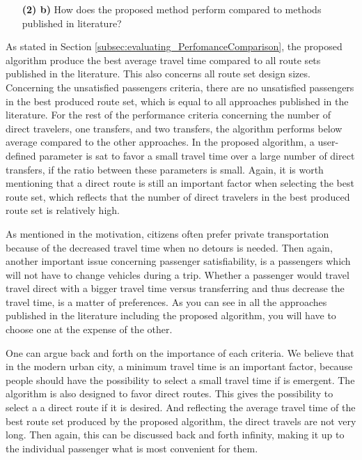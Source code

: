 \begin{itemize}
\item[\textbf{(2) b)}] How does the proposed method perform compared to methods published in literature?
\end{itemize}

As stated in Section \vref{subsec:evaluating_PerfomanceComparison}, the proposed algorithm produce the best average travel time compared to all route sets published in the literature. This also concerns all route set design sizes. Concerning the unsatisfied passengers criteria, there are no unsatisfied passengers in the best produced route set, which is equal to all approaches published in the literature. For the rest of the performance criteria concerning the number of direct travelers, one transfers, and two transfers, the algorithm performs below average compared to the other approaches. In the proposed algorithm, a user-defined parameter is sat to favor a small travel time over a large number of direct transfers, if the ratio between these parameters is small. Again, it is worth mentioning that a direct route is still an important factor when selecting the best route set, which reflects that the number of direct travelers in the best produced route set is relatively high.

As mentioned in the motivation, citizens often prefer private transportation because of the decreased travel time when no detours is needed. Then again, another important issue concerning passenger satisfiability, is a passengers which will not have to change vehicles during a trip. Whether a passenger would travel travel direct with a bigger travel time versus transferring and thus decrease the travel time, is a matter of preferences. As you can see in all the approaches published in the literature including the proposed algorithm, you will have to choose one at the expense of the other. 

One can argue back and forth on the importance of each criteria. We believe that in the modern urban city, a minimum travel time is an important factor, because people should have the possibility to select a small travel time if is emergent. The algorithm is also designed to favor direct routes. This gives the possibility to select a a direct route if it is desired. And reflecting the average travel time of the best route set produced by the proposed algorithm, the direct travels are not very long. %
Then again, this can be discussed back and forth infinity, making it up to the individual passenger what is most convenient for them. 


